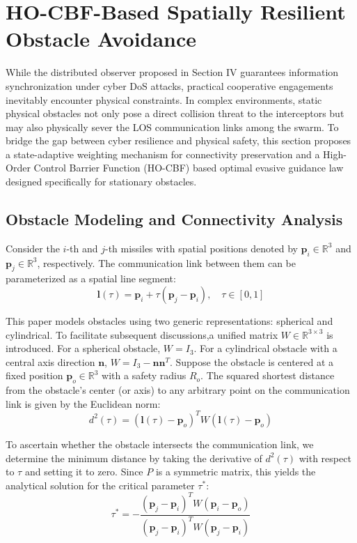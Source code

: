 \documentclass[lettersize,journal]{IEEEtran}
\begin{document}
\section{HO-CBF-Based Spatially Resilient Obstacle Avoidance}
While the distributed observer proposed in Section IV guarantees information synchronization under cyber DoS attacks, practical cooperative engagements inevitably encounter physical constraints. In complex environments, static physical obstacles not only pose a direct collision threat to the interceptors but may also physically sever the LOS communication links among the swarm. To bridge the gap between cyber resilience and physical safety, this section proposes a state-adaptive weighting mechanism for connectivity preservation and a High-Order Control Barrier Function (HO-CBF) based optimal evasive guidance law designed specifically for stationary obstacles.
\subsection{Obstacle Modeling and Connectivity Analysis}
Consider the $i$-th and $j$-th missiles with spatial positions denoted by $\mathbf{p}_i \in \mathbb{R}^3$ and $\mathbf{p}_j \in \mathbb{R}^3$, respectively. The communication link between them can be parameterized as a spatial line segment:
\begin{equation}
	\mathbf{l}(\tau) = \mathbf{p}_i + \tau(\mathbf{p}_j - \mathbf{p}_i), \quad \tau \in [0, 1]
\end{equation}

This paper models obstacles using two generic representations: spherical and cylindrical. To facilitate subsequent discussions,a unified matrix $W \in \mathbb{R}^{3 \times 3}$ is introduced. For a spherical obstacle, $W = I_3$. For a cylindrical obstacle with a central axis direction $\mathbf{n}$, $W = I_3 - \mathbf{n}\mathbf{n}^T$. Suppose the obstacle is centered at a fixed position $\mathbf{p}_o \in \mathbb{R}^3$ with a safety radius $R_o$. The squared shortest distance from the obstacle's center (or axis) to any arbitrary point on the communication link is given by the Euclidean norm:
\begin{equation}
	d^2(\tau) = (\mathbf{l}(\tau) - \mathbf{p}_o)^T W (\mathbf{l}(\tau) - \mathbf{p}_o)
\end{equation}

To ascertain whether the obstacle intersects the communication link, we determine the minimum distance by taking the derivative of $d^2(\tau)$ with respect to $\tau$ and setting it to zero. Since $P$ is a symmetric matrix, this yields the analytical solution for the critical parameter $\tau^*$:
\begin{equation}
	\tau^* = - \frac{(\mathbf{p}_j - \mathbf{p}_i)^T W (\mathbf{p}_i - \mathbf{p}_o)}{(\mathbf{p}_j - \mathbf{p}_i)^T W (\mathbf{p}_j - \mathbf{p}_i)}
\end{equation}
\end{document}
